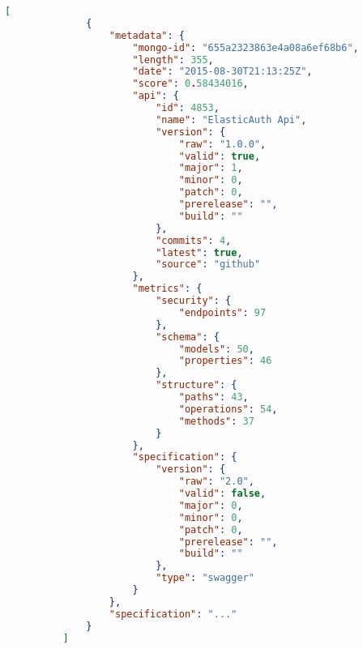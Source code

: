 \begin{center}
    \lstset{
        numbers=left,
        firstnumber=1,
        numberfirstline=true
    }

    \begin{lstlisting}[label={lst:search-response},language=json,caption={Example of response for the search endpoint},captionpos=b]
          [
              {
                  "metadata": {
                      "mongo-id": "655a2323863e4a08a6ef68b6",
                      "length": 355,
                      "date": "2015-08-30T21:13:25Z",
                      "score": 0.58434016,
                      "api": {
                          "id": 4853,
                          "name": "ElasticAuth Api",
                          "version": {
                              "raw": "1.0.0",
                              "valid": true,
                              "major": 1,
                              "minor": 0,
                              "patch": 0,
                              "prerelease": "",
                              "build": ""
                          },
                          "commits": 4,
                          "latest": true,
                          "source": "github"
                      },
                      "metrics": {
                          "security": {
                              "endpoints": 97
                          },
                          "schema": {
                              "models": 50,
                              "properties": 46
                          },
                          "structure": {
                              "paths": 43,
                              "operations": 54,
                              "methods": 37
                          }
                      },
                      "specification": {
                          "version": {
                              "raw": "2.0",
                              "valid": false,
                              "major": 0,
                              "minor": 0,
                              "patch": 0,
                              "prerelease": "",
                              "build": ""
                          },
                          "type": "swagger"
                      }
                  },
                  "specification": "..."
              }
          ]
    \end{lstlisting}
\end{center}

